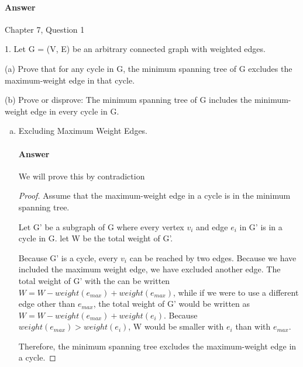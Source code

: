 \documentclass{article}
\begin{document}
\paragraph{Answer}
\todo{}

\collab{}

Chapter 7, Question 1

1. Let G = (V, E) be an arbitrary connected graph with weighted edges.

(a) Prove that for any cycle in G, the minimum spanning tree of G excludes
the maximum-weight edge in that cycle.

(b) Prove or disprove: The minimum spanning tree of G includes the
minimum-weight edge in every cycle in G.

\begin{enumerate}[(a)]

    \item Excluding Maximum Weight Edges.

        \paragraph{Answer}

        We will prove this by contradiction

        \begin{proof}

            Assume that the maximum-weight edge in a cycle is in the minimum spanning
            tree.

            Let G' be a subgraph of G where every vertex $v_{i}$ and edge $e_{i}$ in G'
            is in a cycle in G. let W be the total weight of G'.

            Because G' is a cycle, every $v_{i}$ can be reached by two edges.
            Because we have included the maximum weight edge, we have excluded
            another edge. The total weight of G' with the can be written $W = W -
            weight(e_{max}) + weight(e_{max})$, while if we were to use a different
            edge other than $e_{max}$, the total weight of G' would be written as
            $W = W - weight(e_{max}) + weight(e_{i})$. Because $weight(e_{max}) > weight(e_{i})$, W would be smaller with $e_{i}$ than with $e_{max}$.

            Therefore, the minimum spanning tree excludes the maximum-weight
            edge in a cycle.

        \end{proof}



\end{enumerate}
\end{document}
